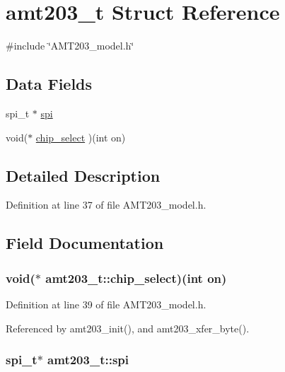 \hypertarget{structamt203__t}{\section{amt203\-\_\-t Struct Reference}
\label{structamt203__t}
}


{\ttfamily \#include \char`\"{}A\-M\-T203\-\_\-model.\-h\char`\"{}}

\subsection*{Data Fields}
\begin{DoxyCompactItemize}
\item 
spi\-\_\-t $\ast$ \hyperlink{structamt203__t_a60f1c7606de69fef34add270769be028}{spi}
\item 
void($\ast$ \hyperlink{structamt203__t_a6cfcff7f607042fe15407cdda67db194}{chip\-\_\-select} )(int on)
\end{DoxyCompactItemize}


\subsection{Detailed Description}


Definition at line 37 of file A\-M\-T203\-\_\-model.\-h.



\subsection{Field Documentation}
\hypertarget{structamt203__t_a6cfcff7f607042fe15407cdda67db194}{
\subsubsection[{chip\-\_\-select}]{\setlength{\rightskip}{0pt plus 5cm}void($\ast$ amt203\-\_\-t\-::chip\-\_\-select)(int on)}}\label{structamt203__t_a6cfcff7f607042fe15407cdda67db194}


Definition at line 39 of file A\-M\-T203\-\_\-model.\-h.



Referenced by amt203\-\_\-init(), and amt203\-\_\-xfer\-\_\-byte().

\hypertarget{structamt203__t_a60f1c7606de69fef34add270769be028}{
\subsubsection[{spi}]{\setlength{\rightskip}{0pt plus 5cm}spi\-\_\-t$\ast$ amt203\-\_\-t\-::spi}}\label{structamt203__t_a60f1c7606de69fef34add270769be028}


